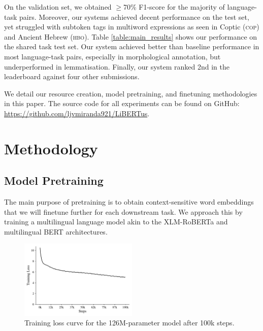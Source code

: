 \documentclass[11pt]{article}
\newcommand{\githuburl}{\url{https://github.com/ljvmiranda921/LiBERTus}}
\begin{document}
On the validation set, we obtained $\geq$70\% F1-score for the majority of language-task pairs.
Moreover, our systems achieved decent performance on the test set, yet struggled with subtoken tags in multiword expressions as seen in Coptic (\textsc{cop}) and Ancient Hebrew (\textsc{hbo}).
Table \ref{table:main_results} shows our performance on the shared task test set.
Our system achieved better than baseline performance in most language-task pairs, especially in morphological annotation, but underperformed in lemmatisation.
Finally, our system ranked 2nd in the leaderboard against four other submissions.

We detail our resource creation, model pretraining, and finetuning methodologies in this paper.
The source code for all experiments can be found on GitHub: \githuburl{}.



\section{Methodology}

\subsection{Model Pretraining}

The main purpose of pretraining is to obtain context-sensitive word embeddings that we will finetune further for each downstream task.
We approach this by training a multilingual language model akin to the XLM-RoBERTa \cite{conneau-etal-2020-unsupervised} and multilingual BERT \cite{devlin-etal-2019-bert} architectures.

\begin{figure}[t]
  \centering
  \includegraphics[width=0.5\textwidth]{figures/train_loss.pdf}
  \caption{Training loss curve for the 126M-parameter model after 100k steps.}
  \label{fig:training_curve}
\end{figure}
\end{document}

